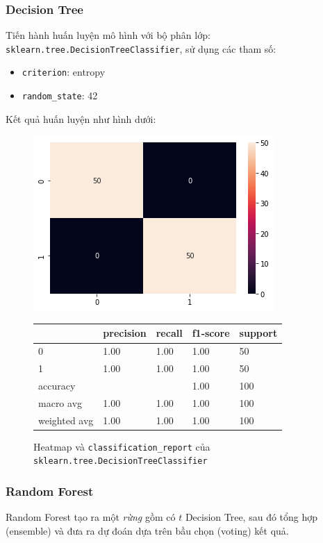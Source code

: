 \documentclass[12pt]{article}
\begin{document}
\subsubsection{Decision Tree}
Tiến hành huấn luyện mô hình với bộ phân lớp: \texttt{sklearn.tree.DecisionTreeClassifier}, sử dụng các tham số:
\begin{itemize}
	\item \texttt{criterion}: entropy
	\item \texttt{random\_state}: 42
\end{itemize}
Kết quả huấn luyện như hình dưới:
\begin{figure}[H]
\begin{multicols}{2}
\includegraphics[scale=.5]{img/train-dt-result.png}

\begin{table}[H]
\begin{tabular}{l l l l l}
\hline
 & precision & recall & f1-score & support \\
\hline
0 & 1.00 & 1.00 & 1.00 & 50 \\
1 & 1.00 & 1.00 & 1.00 & 50 \\
accuracy &   &   & 1.00 & 100 \\
macro avg & 1.00 & 1.00 & 1.00 & 100 \\
weighted avg & 1.00 & 1.00 & 1.00 & 100 \\
\hline
\end{tabular}
\end{table}
\end{multicols}
\label{fig:heatmap_testing}
\caption{Heatmap và \texttt{classification\_report} của \texttt{sklearn.tree.DecisionTreeClassifier}}
\end{figure}


\subsubsection{Random Forest}
Random Forest tạo ra một \textit{rừng} gồm có $t$ Decision Tree, sau đó tổng hợp (ensemble) và đưa ra dự đoán dựa trên bầu chọn (voting) kết quả.
\end{document}
